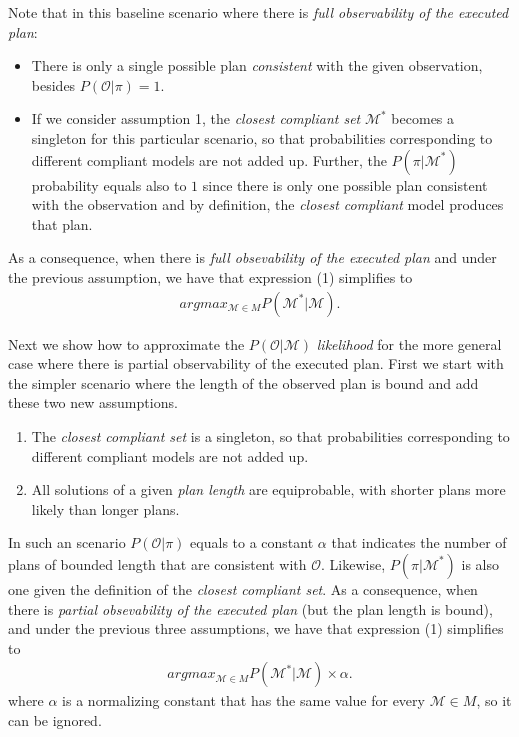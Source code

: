 \documentclass[letterpaper]{article} %
\begin{document}
Note that in this baseline scenario where there is {\em full observability of the executed plan}:
\begin{itemize}
\item There is only a single possible plan {\em consistent} with the given observation, besides $P(\mathcal{O}|\pi)=1$.
\item If we consider assumption 1, the {\em closest compliant set} $\mathcal{M}^*$ becomes a singleton for this particular scenario, so that probabilities corresponding to different compliant models are not added up. Further, the $P(\pi|\mathcal{M^*})$ probability equals also to $1$ since there is only one possible plan consistent with the observation and by definition, the {\em closest compliant} model produces that plan.
\end{itemize}
As a consequence, when there is {\em full obsevability of the executed plan} and under the previous assumption, we have that expression (1) simplifies to
\begin{align}
argmax_{\mathcal{M}\in M} P(\mathcal{M^*}|\mathcal{M}).
\end{align}

Next we show how to approximate the $P(\mathcal{O}|\mathcal{M})$ {\em likelihood} for the more general case where there is partial observability of the executed plan. First we start with the simpler scenario where the length of the observed plan is bound and add these two new assumptions.
\begin{enumerate}\addtocounter{enumi}{1}
\item The {\em closest compliant set} is a singleton, so that probabilities corresponding to different compliant models are not added up.
\item All solutions of a given {\em plan length} are equiprobable, with shorter plans more likely than longer plans.  
\end{enumerate}

In such an scenario $P(\mathcal{O}|\pi)$ equals to a constant $\alpha$ that indicates the number of plans of bounded length that are consistent with $\mathcal{O}$. Likewise, $P(\pi|\mathcal{M^*})$ is also one given the definition of the {\em closest compliant set}. As a consequence, when there is {\em partial obsevability of the executed plan} (but the plan length is bound), and under the previous three assumptions, we have that expression (1) simplifies to
\begin{align}
argmax_{\mathcal{M}\in M} P(\mathcal{M^*}|\mathcal{M})\times \alpha.
\end{align}
where $\alpha$ is a normalizing constant that has the same value for every $\mathcal{M}\in M$, so it can be ignored.
\end{document}
